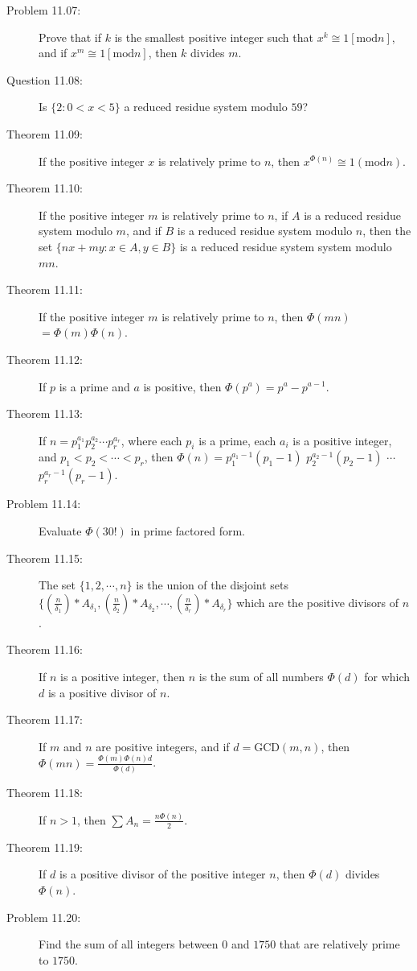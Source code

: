 \documentclass{article}
\begin{document}
\begin{description}
  \item[Problem 11.07:] Prove that if $k$ is the smallest positive integer such that $x^k \cong 1 [\text{mod} n]$, and if $x^m \cong 1 [\text{mod} n]$, then $k$ divides $m$.

  \item[Question 11.08:] Is $\{ 2: 0<x<5 \}$ a reduced residue system modulo $59$?

  \item[Theorem 11.09:] If the positive integer $x$ is relatively prime to $n$, then $x^{\Phi(n)} \cong 1 (\text{mod} n)$.

  \item[Theorem 11.10:] If the positive integer $m$ is relatively prime to $n$, if $A$ is a reduced residue system modulo $m$, and if $B$ is a reduced residue system modulo $n$, then the set $\{ nx+my: x \in A, y \in B \}$ is a reduced residue system system modulo $mn$.

  \item[Theorem 11.11:] If the positive integer $m$ is relatively prime to $n$, then $\Phi(mn)$ $= \Phi(m) \Phi(n)$.

  \item[Theorem 11.12:] If $p$ is a prime and $a$ is positive, then $\Phi(p^{a}) = p^{a}-p^{a-1}$.

  \item[Theorem 11.13:] If $n = p_1^{a_1} p_2^{a_2} \cdots p_r^{a_r}$, where each $p_i$ is a prime, each $a_i$ is a positive integer, and $p_1 < p_2 < \cdots <p_r$, then $\Phi(n) = p_1^{a_1-1} (p_1-1)$ $p_2^{a_2-1} (p_2-1)$ $\cdots$ $p_r^{a_r-1} (p_r-1)$.

  \item[Problem 11.14:] Evaluate $\Phi(30!)$ in prime factored form.

  \item[Theorem 11.15:] The set $\{ 1, 2, \cdots, n \}$ is the union of the disjoint sets $\{ \left( \frac{n}{\delta_1} \right) *A_{\delta_1}, \left( \frac{n}{\delta_2} \right) *A_{\delta_2}, \cdots, \left( \frac{n}{\delta_r} \right) *A_{\delta_r} \}$ which are the positive divisors of $n$.

  \item[Theorem 11.16:] If $n$ is a positive integer, then $n$ is the sum of all numbers $\Phi(d)$ for which $d$ is a positive divisor of $n$.

  \item[Theorem 11.17:] If $m$ and $n$ are positive integers, and if $d=\text{GCD}(m,n)$, then $\Phi(mn) = \frac{\Phi(m) \Phi(n) d}{\Phi(d)}$.

  \item[Theorem 11.18:] If $n>1$, then $\sum A_n = \frac{n \Phi(n)}{2}$.

  \item[Theorem 11.19:] If $d$ is a positive divisor of the positive integer $n$, then $\Phi(d)$ divides $\Phi(n)$.

  \item[Problem 11.20:] Find the sum of all integers between $0$ and $1750$ that are relatively prime to $1750$.

\end{description}
\end{document}
